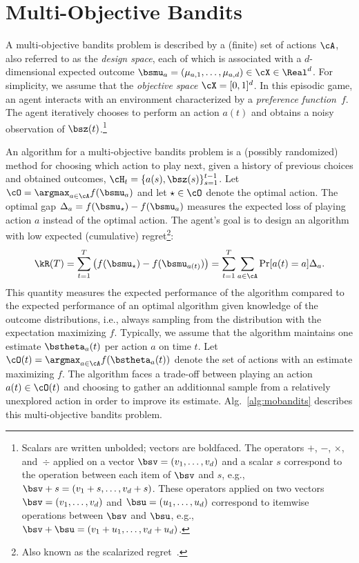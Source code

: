 
\section{Multi-Objective Bandits}
\label{sec:momab}

A multi-objective bandits problem is described by a (finite) set of actions $\cA$, also referred to as the \emph{design space}, each of which is associated with a $d$-dimensional expected outcome $\bsmu_a = (\mu_{a, 1}, \dots, \mu_{a, d}) \in \cX \in \Real^d$. For simplicity, we assume that the \emph{objective space} $\cX = [0, 1]^d$. In this episodic game, an agent interacts with an environment characterized by a \emph{preference function}~$f$. The agent iteratively chooses to perform an action $a(t)$ and obtains a noisy observation of $\bsz(t)$.\footnote{Scalars are written unbolded; vectors are boldfaced. The operators $+$, $-$, $\times$, and~$\div$ applied on a vector $\bsv = (v_1, \dots, v_d)$ and a scalar $s$ correspond to the operation between each item of $\bsv$ and $s$, e.g., $\bsv + s = (v_1 + s, \dots, v_d + s)$. These operators applied on two vectors $\bsv = (v_1, \dots, v_d)$ and $\bsu = (u_1, \dots, u_d)$ correspond to itemwise operations between $\bsv$ and $\bsu$, e.g., $\bsv + \bsu = (v_1 + u_1, \dots, v_d + u_d)$.}

An algorithm for a multi-objective bandits problem is a (possibly randomized) method for choosing which action to play next, given a history of previous choices and obtained outcomes, $\cH_t = \{ a(s), \bsz(s) \}_{s = 1}^{t-1}$. Let $\cO = \argmax_{a \in \cA} f(\bsmu_a)$ and let $\star \in \cO$ denote the optimal action. The optimal gap $\Delta_a = f(\bsmu_\star)- f(\bsmu_a)$ measures the expected loss of playing action $a$ instead of the optimal action. The agent's goal is to design an algorithm with low expected (cumulative) regret\footnote{Also known as the scalarized regret~\cite{Drugan2013}.}:
\begin{align}
\label{eqn:regret}
    \kR(T)
    = \sum_{t=1}^T \big( f(\bsmu_\star) - f(\bsmu_{a(t)}) \big)
    = \sum_{t = 1}^T \sum_{a \in \cA} \Pr[a(t) = a] \Delta_a.
\end{align}
This quantity measures the expected performance of the algorithm compared to the expected performance of an optimal algorithm given knowledge of the outcome distributions, i.e., always sampling from the distribution with the expectation maximizing $f$. Typically, we assume that the algorithm maintains one estimate $\bstheta_a(t)$ per action $a$ on time $t$. Let $\cO(t) = \argmax_{a \in \cA} f(\bstheta_a(t))$ denote the set of actions with an estimate maximizing $f$. The algorithm faces a trade-off between playing an action $a(t) \in \cO(t)$ and choosing to gather an additionnal sample from a relatively unexplored action in order to improve its estimate. Alg.~\ref{alg:mobandits} describes this multi-objective bandits problem.


